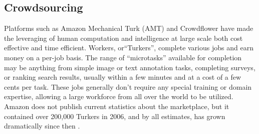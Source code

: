 \subsection{Crowdsourcing}

Platforms such as Amazon Mechanical Turk (AMT) and Crowdflower have made the leveraging of human computation and intelligence at large scale both cost effective and time efficient.  Workers, or``Turkers'', complete various jobs and earn money on a per-job basis.  The range of ``microtasks'' available for completion may be anything from simple image or text annotation tasks, completing surveys, or ranking search results, usually within a few minutes and at a cost of a few cents per task.  These jobs generally don't require any special training or domain expertise, allowing a large workforce from all over the world to be utilized.  Amazon does not publish current statistics about the marketplace, but it contained over 200,000 \cite{AWS:2006} Turkers in 2006, and by all estimates, has grown dramatically since then \cite{Ross:2010:CSD:1753846.1753873}.
